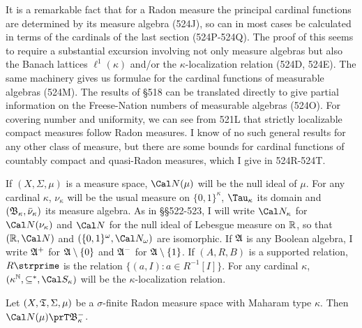 \def\chaptername{Cardinal functions of measure theory}
\def\sectionname{Radon measures}


It is a remarkable fact that for a Radon measure the principal cardinal
functions are determined by its measure algebra (524J), so can in most
cases be calculated in terms of the cardinals of
the last section (524P-524Q).   The proof of this seems to require a
substantial excursion involving not only measure algebras but also the
Banach lattices $\ell^1(\kappa)$ and/or the $\kappa$-localization
relation (524D, 524E).   The same machinery gives us formulae for the
cardinal functions of measurable algebras (524M).   The results of \S518
can be translated directly to give partial information on the
Freese-Nation numbers of measurable algebras (524O).   For covering
number and uniformity, we can see from 521L that strictly localizable
compact measures follow Radon measures.
I know of no such general results for any other class of measure, but
there are some bounds for cardinal functions of countably compact and
quasi-Radon measures, which I give in 524R-524T.  %

 If $(X,\Sigma,\mu)$ is a measure space,
$\Cal N(\mu)$ will be the null ideal of $\mu$.
For any cardinal $\kappa$, $\nu_{\kappa}$ will be the usual measure on
$\{0,1\}^{\kappa}$, $\Tau_{\kappa}$ its domain and
$(\frak B_{\kappa},\bar\nu_{\kappa})$ its measure algebra.   As in
\S\S522-523, I will
write $\Cal N_{\kappa}$ for $\Cal N(\nu_{\kappa})$ and $\Cal N$ for the
null ideal of Lebesgue measure on $\Bbb R$, so that
$(\Bbb R,\Cal N)$ and $(\{0,1\}^{\omega},\Cal N_{\omega})$ are
isomorphic.
If $\frak A$ is any Boolean algebra, I write $\frak A^+$ for
$\frak A\setminus\{0\}$ and $\frak A^-$ for $\frak A\setminus\{1\}$.
If $(A,R,B)$ is a supported relation, $R\strprime$ is the
relation $\{(a,I):a\in R^{-1}[I]\}$.
For any cardinal $\kappa$, $(\kappa^{\Bbb N},\subseteq^*,\Cal S_{\kappa})$
will be the $\kappa$-localization relation.

 Let $(X,\frak T,\Sigma,\mu)$ be a
$\sigma$-finite
Radon measure space with Maharam type $\kappa$.   Then
$\Cal N(\mu)\prT\frak B_{\kappa}^-$.

